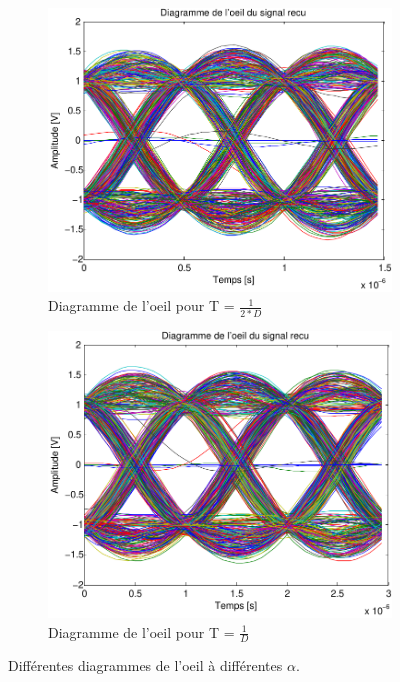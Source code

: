 \documentclass[a4paper,11pt]{article}
\begin{document}
\begin{figure}
	\begin{subfigure}{.5\textwidth}
  		\centering
  		\includegraphics[width=1\linewidth]{Q10-Tsur2-crop.pdf}
  		\caption{Diagramme de l'oeil pour T = $\frac{1}{2*D}$}
  		\label{fig:q10t2}
	\end{subfigure}
	\begin{subfigure}{.5\textwidth}
  		\centering
  		\includegraphics[width=1\linewidth]{Q10-EbNo20-crop.pdf}
  		\caption{Diagramme de l'oeil pour T = $\frac{1}{D}$}
  		\label{fig:q10t1}
	\end{subfigure}
	\caption{Différentes diagrammes de l'oeil à différentes $\alpha$.}
	\label{fig:q10t}
\end{figure} 
\end{document}
